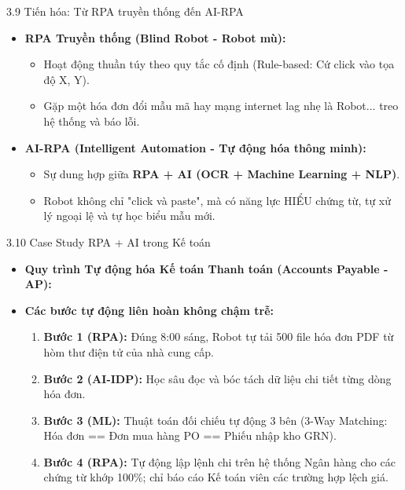 \documentclass[aspectratio=169]{beamer}
\begin{document}
\begin{frame}{3.9 Tiến hóa: Từ RPA truyền thống đến AI-RPA}
    \begin{itemize}
        \item \textbf{RPA Truyền thống (Blind Robot - Robot mù):}
        \begin{itemize}
            \item Hoạt động thuần túy theo quy tắc cố định (Rule-based: Cứ click vào tọa độ X, Y).
            \item Gặp một hóa đơn đổi mẫu mã hay mạng internet lag nhẹ là Robot... treo hệ thống và báo lỗi.
        \end{itemize}
        \item \textbf{AI-RPA (Intelligent Automation - Tự động hóa thông minh):}
        \begin{itemize}
            \item Sự dung hợp giữa \textbf{RPA + AI (OCR + Machine Learning + NLP)}.
            \item Robot không chỉ "click và paste", mà có năng lực HIỂU chứng từ, tự xử lý ngoại lệ và tự học biểu mẫu mới.
        \end{itemize}
    \end{itemize}
\end{frame}

\begin{frame}{3.10 Case Study RPA + AI trong Kế toán}
    \begin{itemize}
        \item \textbf{Quy trình Tự động hóa Kế toán Thanh toán (Accounts Payable - AP):}
        \item \textbf{Các bước tự động liên hoàn không chậm trễ:}
        \begin{enumerate}
            \item \textbf{Bước 1 (RPA):} Đúng 8:00 sáng, Robot tự tải 500 file hóa đơn PDF từ hòm thư điện tử của nhà cung cấp.
            \item \textbf{Bước 2 (AI-IDP):} Học sâu đọc và bóc tách dữ liệu chi tiết từng dòng hóa đơn.
            \item \textbf{Bước 3 (ML):} Thuật toán đối chiếu tự động 3 bên (3-Way Matching: Hóa đơn == Đơn mua hàng PO == Phiếu nhập kho GRN).
            \item \textbf{Bước 4 (RPA):} Tự động lập lệnh chi trên hệ thống Ngân hàng cho các chứng từ khớp 100\%; chỉ báo cáo Kế toán viên các trường hợp lệch giá.
        \end{enumerate}
    \end{itemize}
\end{frame}
\end{document}
